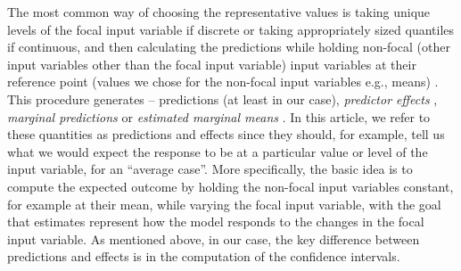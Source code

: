 The most common way of choosing the representative values is taking unique levels of the focal input variable if discrete or taking appropriately sized quantiles if continuous, and then calculating the predictions while holding non-focal (other input variables other than the focal input variable) input variables at their reference point (values we chose for the non-focal input variables e.g., means) \citep{fox2009effect, hanmer2013behind}. This procedure generates -- predictions (at least in our case), \emph{predictor effects} \citep{fox2009effect}, \emph{marginal predictions} \citep{leeper2017package} or \emph{estimated marginal means} \citep{lenth2018package}. In this article, we refer to these quantities as predictions and effects since they should, for example, tell us what we would expect the response to be at a particular value or level of the input variable, for an ``average case''. More specifically, the basic idea is to compute the expected outcome by holding the non-focal input variables constant, for example at their mean, while varying the focal input variable, with the goal that estimates represent how the model responds to the changes in the focal input variable. As mentioned above, in our case, the key difference between predictions and effects is in the computation of the confidence intervals.

